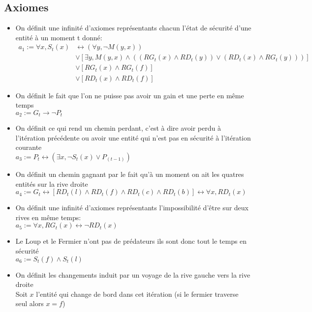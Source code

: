 \documentclass{article}
\begin{document}
\subsection{Axiomes}
\begin{itemize}
  \item \small On définit une infinité d'axiomes représentants chacun l'état de sécurité d'une entité à un moment t donné:
        \begin{align*}
          a_1:= \forall x,S_t(x) & \leftrightarrow  (\forall y, \neg M(y,x)) \\ 
                                 &\vee [\exists y , M(y,x) \wedge ((RG_t(x)\wedge RD_t(y)) \vee (RD_t(x)\wedge RG_t(y)))]\\
                                 & \vee [RG_t(x) \wedge RG_t(f)]             \\
                                 & \vee [RD_t(x) \wedge RD_t(f)]
        \end{align*}
  \item On définit le fait que l'on ne puisse pas avoir un gain et une perte en même temps\\
        $a_2:= G_t \to \neg P_t$
  \item On définit ce qui rend un chemin perdant, c'est à dire avoir perdu à l'itération précédente ou avoir une entité qui n'est pas en sécurité à l'itération courante\\
        $a_3:= P_t \leftrightarrow (\exists x, \neg S_t(x) \vee P_{(t-1)})$
  \item On définit un chemin gagnant par le fait qu'à un moment on ait les quatres entités sur la rive droite\\
        $a_4:= G_t \leftrightarrow [RD_t(l) \wedge RD_t(f) \wedge RD_t(c) \wedge RD_t(b)] \leftrightarrow  \forall x, RD_t(x)$
  \item On définit une infinité d'axiomes représentants l'impossibilité d'être sur deux rives en même temps:\\
  $a_5 := \forall x ,RG_t(x) \leftrightarrow \neg RD_t(x)$
  \item Le Loup et le Fermier n'ont pas de prédateurs ils sont donc tout le temps en sécurité\\
        $a_6 := S_t(f) \wedge S_t(l)$
  \item On définit les changements induit par un voyage de la rive gauche vers la rive droite\\
  Soit $x$ l'entité qui change de bord dans cet itération (si le fermier traverse seul alors $x =f$)\\

\end{itemize}
\end{document}

